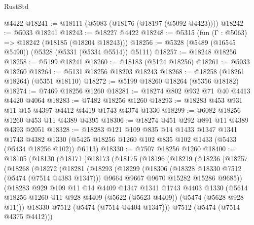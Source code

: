 \begin{lexlean}{RustStd}
\begin{coremodule}
    @4422
@18241 := @18111 (@5083 (@18176 (@18197 (@5092 @4423))))
@18242 := @5033 @18241
@18243 := @18227 @4422
@18248 := @5315 (fun (Γ : @5063) => @18242 (@18185 (@18204 @18243)))
@18256 := @5328 (@5489 (@16545 @5490)) (@5328 (@5331 (@5334 @5514)) @5111)
@18257 := @18248 @18256
@18258 := @5199 @18241
@18260 := @18183 (@5124 @18256)
@18261 := @5033 @18260
@18264 := @5131 @18256 @18203 @18243
@18268 := @18258 (@18261 @18264) (@5351 @18110)
@18272 := @5199 @18260 @18264 (@5356 @18182)
@18274 := @7469 @18256 @1260
@18281 := @18274 @802 @932 @71 @40 @4413 @4420 @4064
@18283 := @7482 @18256 @1260
@18293 := @18283 @453 @931 @11 @15 @4397 @4412 @4419 @1743 @4374 @1330
@18299 := @6082 @18256 @1260 @453 @11 @4389 @4395
@18306 := @18274 @451 @292 @891 @11 @4389 @4393 @2051
@18328 := @18283
    @121
    @109
    @835
    @14
    @1433
    @1347
    @1341
    @1743
    @4382
    @1330
    (@5425 @18256 @1260 @102 @835 @102 @1433 (@5433 (@5434 @18256 @102)) @6113)
@18330 := @7507 @18256 @1260
@18400 := @18105
    (@18130
      (@18171
        (@18173
          (@18175
            (@18196
              (@18219
                (@18236
                  (@18257
                    (@18268
                      (@18272
                        (@18281
                          (@18293
                            (@18299
                              (@18306
                                (@18328 @18330 @7512 (@5474 (@7514 @4383 @1347)))
                                @9664
                                @9667
                                @9670
                                @15282
                                @15286
                                @9685))
                            (@18283
                              @929
                              @109
                              @11
                              @14
                              @4409
                              @1347
                              @1341
                              @1743
                              @4403
                              @1330
                              (@5614
                                @18256
                                @1260
                                @11
                                @928
                                @4409
                                (@5622 (@5623 @4409))
                                (@5474 (@5628 @928 @11)))
                              @18330
                              @7512
                              (@5474 (@7514 @4404 @1347)))
                            @7512
                            (@5474 (@7514 @4375 @4412)))

\end{coremodule}
\end{lexlean}
